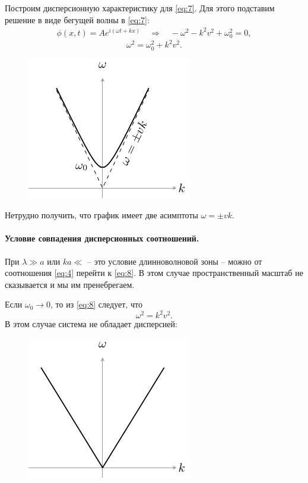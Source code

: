 Построим дисперсионную характеристику для \eqref{eq:7}. Для этого подставим решение в виде бегущей волны в \eqref{eq:7}:
\begin{gather*}
	\phi(x,t)=Ae^{i(\omega t + kx)} \quad \Rightarrow \quad -\omega^2-k^2v^2+\omega_0^2=0,
\end{gather*}
\begin{equation}
	\omega^2 = \omega_0^2 + k^2v^2.
	\label{eq:8}
\end{equation}
\begin{figure}[H]
	\centering
	\includegraphics[scale=1.5]{img/osci_and_wave_in_ordered_struct/disp_of_cont}
\end{figure}
Нетрудно получить, что график имеет две асимптоты $\omega=\pm vk$. 

\paragraph{Условие совпадения дисперсионных соотношений. } При $\lambda\gg a$ или $ka\ll$ -- это условие длинноволновой зоны -- можно от соотношения \eqref{eq:4} перейти к \eqref{eq:8}. В этом случае пространственный масштаб не сказывается и мы им пренебрегаем. 

Если  $\omega_0 \rightarrow 0$, то из \eqref{eq:8} следует, что 
\begin{equation}
	\omega^2=k^2v^2.
	\label{eq:9}
\end{equation}
В этом случае система не обладает дисперсией:

\begin{figure}[H]
	\centering
	\includegraphics[scale=1.5]{img/osci_and_wave_in_ordered_struct/no_disp} 
\end{figure}

